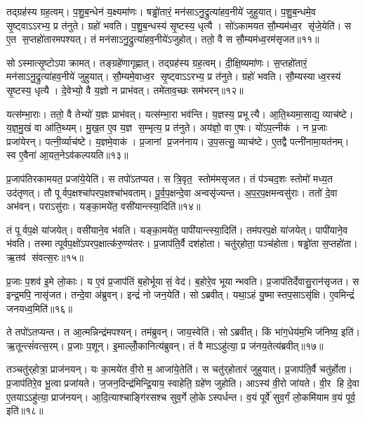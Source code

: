 तद्ग्रह॑स्य ग्रह॒त्वम्।
प॒शु॒ब॒न्धेन॑ य॒क्ष्यमा॑णः।
षड्ढो॑तारं॒ मन॑साऽनु॒द्रुत्या॑हव॒नीये॑ जुहुयात्।
प॒शु॒ब॒न्धमे॒व सृ॒ष्ट्वाऽऽरभ्य॒ प्र त॑नुते।
ग्रहो॑ भवति।
प॒शु॒ब॒न्धस्य॑ सृ॒ष्टस्य॒ धृत्यै।
सो॑ऽकामयत सौ॒म्यम॑ध्व॒र सृ॑जे॒येति॑।
स ए॒त स॒प्तहो॑तारमपश्यत्।
तं मन॑साऽनु॒द्रुत्या॑हव॒नीये॑ऽजुहोत्।
ततो॒ वै स सौ॒म्यम॑ध्व॒रम॑सृजत॥११॥

सोऽस्मात्सृ॒ष्टोऽपाक्रामत्।
तङ्ग्रहे॑णागृह्णात्।
तद्ग्रह॑स्य ग्रह॒त्वम्।
दी॒क्षि॒ष्यमा॑णः।
स॒प्तहो॑तारं॒ मन॑साऽनु॒द्रुत्या॑हव॒नीये॑ जुहुयात्।
सौ॒म्यमे॒वाध्व॒र सृ॒ष्ट्वाऽऽरभ्य॒ प्र त॑नुते।
ग्रहो॑ भवति।
सौ॒म्यस्याध्व॒रस्य॑ सृ॒ष्टस्य॒ धृत्यै।
दे॒वेभ्यो॒ वै य॒ज्ञो न प्राभ॑वत्।
तमे॑ताव॒च्छः सम॑भरन्॥१२॥

यत्स॑म्भा॒राः।
ततो॒ वै तेभ्यो॑ य॒ज्ञः प्राभ॑वत्।
यत्स॑म्भा॒रा भव॑न्ति।
य॒ज्ञस्य॒ प्रभूत्यै।
आ॒ति॒थ्यमा॒साद्य॒ व्याच॑ष्टे।
य॒ज्ञ॒मु॒खं वा आ॑ति॒थ्यम्।
मु॒ख॒त ए॒व य॒ज्ञ स॒म्भृत्य॒ प्र त॑नुते।
अय॑ज्ञो॒ वा ए॒षः।
यो॑ऽप॒त्नीक॑।
न प्र॒जाः प्रजा॑येरन्।
पत्नी॒र्व्याच॑ष्टे।
य॒ज्ञमे॒वाक॑।
प्र॒जानां प्र॒जन॑नाय।
उ॒प॒सत्सु॒ व्याच॑ष्टे।
ए॒तद्वै पत्नी॑नामा॒यत॑नम्।
स्व ए॒वैना॑ आ॒यत॒नेऽव॑कल्पयति॥१३॥\anuvakamend[त॒नु॒त॒ आ॒लभ॑मानोऽगृह्णादसृजताभरञ्जायेर॒न्थ्षट्च॑]

प्र॒जाप॑तिरकामयत॒ प्रजा॑ये॒येति॑।
स तपो॑ऽतप्यत।
स त्रि॒वृत॒ स्तोम॑मसृजत।
तं प॑ञ्चद॒शः स्तोमो॑ मध्य॒त उद॑तृणत्।
तौ पूर्वप॒क्षश्चा॑परप॒क्षश्चा॑भवताम्।
पू॒र्व॒प॒क्षन्दे॒वा अन्वसृ॑ज्यन्त।
अ॒प॒र॒प॒क्षमन्वसु॑राः।
ततो॑ दे॒वा अभ॑वन्।
पराऽसु॑राः।
यङ्का॒मये॑त॒ वसी॑यान्त्स्या॒दिति॑॥१४॥

तं पूर्वप॒क्षे या॑जयेत्।
वसी॑याने॒व भ॑वति।
यङ्का॒मये॑त॒ पापी॑यान्त्स्या॒दिति॑।
तम॑परप॒क्षे या॑जयेत्।
पापी॑याने॒व भ॑वति।
तस्मात्पूर्वप॒क्षो॑ऽपरप॒क्षात्क॑रु॒ण्य॑तरः।
प्र॒जाप॑ति॒र्वै दश॑होता।
चतु॑र्‌होता॒ पञ्च॑होता।
षड्ढो॑ता स॒प्तहो॑ता।
ऋ॒तव॑ संवत्स॒रः॥१५॥

प्र॒जाः प॒शव॑ इ॒मे लो॒काः।
य ए॒वं प्र॒जाप॑तिं ब॒होर्भूयासं॒ वेद॑।
ब॒होरे॒व भूयान्भवति।
प्र॒जाप॑तिर्देवासु॒रान॑सृजत।
स इन्द्र॒मपि॒ नासृ॑जत।
तन्दे॒वा अ॑ब्रुवन्।
इन्द्रं॑ नो जन॒येति॑।
सोऽब्रवीत्।
यथा॒ऽहं यु॒ष्मास्तप॒साऽसृ॑क्षि।
ए॒वमिन्द्रं॑ जनयध्व॒मिति॑॥१६॥

ते तपो॑ऽतप्यन्त।
त आ॒त्मन्निन्द्र॑मपश्यन्।
तम॑ब्रुवन्।
जाय॒स्वेति॑।
सोऽब्रवीत्।
किं भा॑ग॒धेय॑म॒भि ज॑निष्य॒ इति॑।
ऋ॒तून्त्सं॑वत्स॒रम्।
प्र॒जाः प॒शून्।
इ॒माल्लोँ॒कानित्य॑ब्रुवन्।
तं वै माऽऽहु॑त्या॒ प्र ज॑नय॒तेत्य॑ब्रवीत्॥१७॥

तञ्चतु॑र्‌होत्रा॒ प्राज॑नयन्।
यः का॒मये॑त वी॒रो म॒ आजा॑ये॒तेति॑।
स चतु॑र्‌होतारं जुहुयात्।
प्र॒जाप॑ति॒र्वै चतु॑र्होता।
प्र॒जाप॑तिरे॒व भू॒त्वा प्रजा॑यते।
ज॒जन॒दिन्द्र॑मिन्द्रि॒याय॒ स्वाहेति॒ ग्रहे॑ण जुहोति।
आऽस्य॑ वी॒रो जा॑यते।
वी॒र हि दे॒वा ए॒तयाऽऽहु॑त्या॒ प्राज॑नयन्।
आ॒दि॒त्याश्चाङ्गि॑रसश्च सुव॒र्गे लो॒केऽस्पर्धन्त।
व॒यं पूर्वे॑ सुव॒र्गं लो॒कमि॑याम व॒यं पूर्व॒ इति॑॥१८॥

